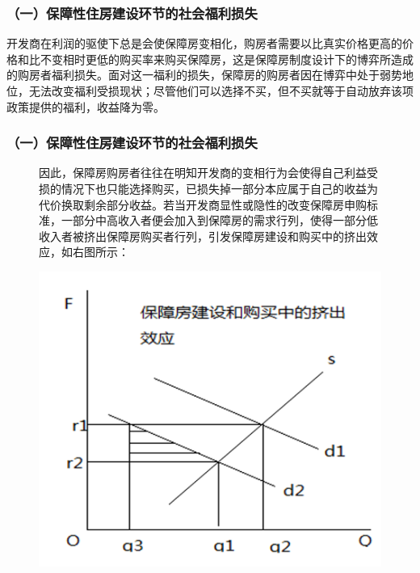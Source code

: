 \documentclass[aspectratio=169, 12pt]{beamer}
\begin{document}
\begin{frame}[plain]
    \frametitle{（一）保障性住房建设环节的社会福利损失}
    开发商在利润的驱使下总是会使保障房变相化，购房者需要以比真实价格更高的价格和比不变相时更低的购买率来购买保障房，这是保障房制度设计下的博弈所造成的购房者福利损失。面对这一福利的损失，保障房的购房者因在博弈中处于弱势地位，无法改变福利受损现状；尽管他们可以选择不买，但不买就等于自动放弃该项政策提供的福利，收益降为零。
\end{frame}

\begin{frame}[plain]
    \frametitle{（一）保障性住房建设环节的社会福利损失}
    \begin{figure}
        \centering
        \begin{minipage}{0.4\linewidth}
            因此，保障房购房者往往在明知开发商的变相行为会使得自己利益受损的情况下也只能选择购买，已损失掉一部分本应属于自己的收益为代价换取剩余部分收益。若当开发商显性或隐性的改变保障房申购标准，一部分中高收入者便会加入到保障房的需求行列，使得一部分低收入者被挤出保障房购买者行列，引发保障房建设和购买中的挤出效应，如右图所示：
        \end{minipage}%
        \begin{minipage}{0.6\linewidth}
            \centering
            \includegraphics[width=1.0\textwidth]{./resources/figure/squeeze.png}
        \end{minipage}
        \end{figure}
\end{frame}
\end{document}
